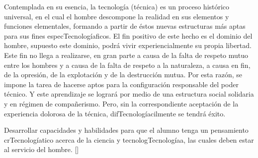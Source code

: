 \begin{syllabus}


\begin{justification}
Contemplada en su esencia, la tecnología (técnica) es un proceso histórico universal, en el cual el hombre descompone la realidad en sus elementos y funciones elementales, formando a partir de éstos nuevas estructuras más aptas para sus fines especTecnologíaficos.
El fin positivo de este hecho es el dominio del hombre,  supuesto este dominio, podrá vivir experiencialmente su propia libertad. Este fin no llega a realizarse, en gran parte a causa de la falta de respeto mutuo entre los hombres y a causa de la falta de respeto a la naturaleza, a causa en fin, de la opresión, de la explotación y de la destrucción mutua.
Por esta razón, se impone la tarea de hacerse aptos para la configuración responsable del poder técnico. Y este aprendizaje se logrará por medio de una estructura social solidaria y en régimen de compañerismo. Pero, sin la correspondiente aceptación de la experiencia dolorosa de la técnica, difTecnologíacilmente se tendrá éxito.
\end{justification}

\begin{goals}
\item Desarrollar capacidades y habilidades para que el alumno tenga un pensamiento crTecnologíatico acerca de  la ciencia y tecnologTecnologíaa, las cuales deben estar al servicio del hombre.  [\Familiarity]
\end{goals}

\begin{outcomes}
    \item {}
    \item {}
\end{outcomes}

\begin{competences}
    \item {}
    \item {}
\end{competences}


\end{syllabus}
